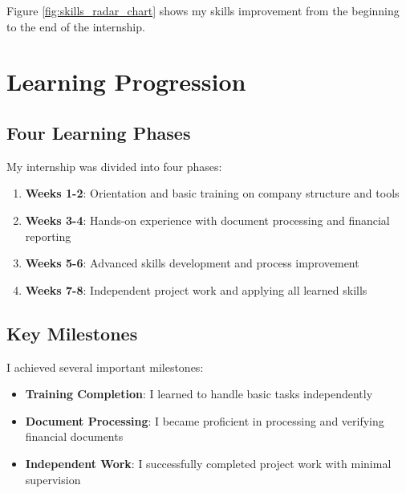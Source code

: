 Figure \ref{fig:skills_radar_chart} shows my skills improvement from the beginning to the end of the internship.

\section{Learning Progression}

\subsection{Four Learning Phases}
My internship was divided into four phases:

\begin{enumerate}[leftmargin=*, itemsep=0.25em]
    \item \textbf{Weeks 1-2}: Orientation and basic training on company structure and tools
    \item \textbf{Weeks 3-4}: Hands-on experience with document processing and financial reporting
    \item \textbf{Weeks 5-6}: Advanced skills development and process improvement
    \item \textbf{Weeks 7-8}: Independent project work and applying all learned skills
\end{enumerate}

\subsection{Key Milestones}
I achieved several important milestones:

\begin{itemize}[leftmargin=*, itemsep=0.25em]
    \item \textbf{Training Completion}: I learned to handle basic tasks independently
    \item \textbf{Document Processing}: I became proficient in processing and verifying financial documents
    \item \textbf{Independent Work}: I successfully completed project work with minimal supervision
\end{itemize}

